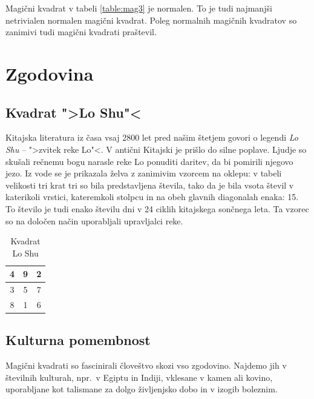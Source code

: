 \documentclass[a4paper,12pt]{article}
\theoremstyle{definition}
\theoremstyle{plain}
\newenvironment{magic}[3]{\begin{table}[!ht]
   \centering
   \caption{#2}
   \label{#3}
   \large
   \begin{tabular}{*{#1}{c|}}
   \hline}{\end{tabular}
   \normalsize
\end{table}}
\begin{document}
Magični kvadrat v tabeli \ref{table:mag3} je normalen.
To je tudi najmanjši netrivialen normalen magični kvadrat.
Poleg normalnih magičnih kvadratov so zanimivi tudi magični kvadrati praštevil.


\section{Zgodovina}

\subsection{Kvadrat ">Lo Shu"<}

Kitajska literatura iz časa vsaj 2800 let pred našim štetjem govori o legendi
\emph{Lo Shu} -- ">zvitek reke Lo"<. V antični Kitajski je prišlo do
silne poplave. Ljudje so skušali rečnemu bogu narasle reke Lo ponuditi daritev,
da bi pomirili njegovo jezo. Iz vode se je prikazala želva z zanimivim vzorcem
na oklepu: v tabeli velikosti tri krat tri so bila predstavljena števila, tako
da je bila vsota števil v katerikoli vrstici, kateremkoli stolpcu in na obeh
glavnih diagonalah enaka: 15. To število je tudi enako številu dni v 24 ciklih
kitajskega sončnega leta. Ta vzorec so na določen način uporabljali upravljalci
reke.



\begin{magic}{3}{Kvadrat Lo Shu}{table:loshu}
     4 & 9 & 2 \\\hline
     3 & 5 & 7 \\\hline
     8 & 1 & 6 \\\hline
\end{magic}


\subsection{Kulturna pomembnost}

Magični kvadrati so fascinirali človeštvo skozi vso zgodovino. Najdemo jih
v številnih kulturah, npr.\ v Egiptu in Indiji, vklesane v kamen ali
kovino, uporabljane kot talismane za dolgo življenjsko dobo in v
izogib boleznim.
\end{document}
